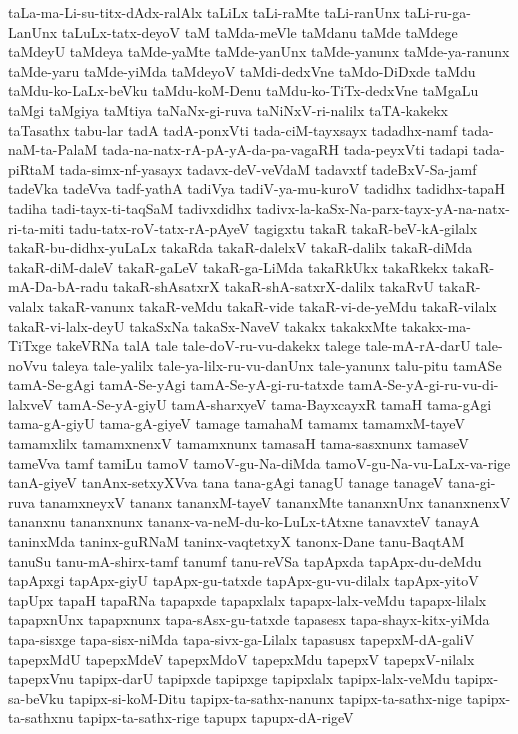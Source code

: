 {taLa-ma-Li-su-titx-dAdx-ralAlx
taLiLx
taLi-raMte
taLi-ranUnx
taLi-ru-ga-LanUnx
taLuLx-tatx-deyoV
taM
taMda-meVle
taMdanu
taMde
taMdege
taMdeyU
taMdeya
taMde-yaMte
taMde-yanUnx
taMde-yanunx
taMde-ya-ranunx
taMde-yaru
taMde-yiMda
taMdeyoV
taMdi-dedxVne
taMdo-DiDxde
taMdu
taMdu-ko-LaLx-beVku
taMdu-koM-Denu
taMdu-ko-TiTx-dedxVne
taMgaLu
taMgi
taMgiya
taMtiya
taNaNx-gi-ruva
taNiNxV-ri-nalilx
taTA-kakekx
taTasathx
tabu-lar
tadA
tadA-ponxVti
tada-ciM-tayxsayx
tadadhx-namf
tada-naM-ta-PalaM
tada-na-natx-rA-pA-yA-da-pa-vagaRH
tada-peyxVti
tadapi
tada-piRtaM
tada-simx-nf-yasayx
tadavx-deV-veVdaM
tadavxtf
tadeBxV-Sa-jamf
tadeVka
tadeVva
tadf-yathA
tadiVya
tadiV-ya-mu-kuroV
tadidhx
tadidhx-tapaH
tadiha
tadi-tayx-ti-taqSaM
tadivxdidhx
tadivx-la-kaSx-Na-parx-tayx-yA-na-natx-ri-ta-miti
tadu-tatx-roV-tatx-rA-pAyeV
tagigxtu
takaR
takaR-beV-kA-gilalx
takaR-bu-didhx-yuLaLx
takaRda
takaR-dalelxV
takaR-dalilx
takaR-diMda
takaR-diM-daleV
takaR-gaLeV
takaR-ga-LiMda
takaRkUkx
takaRkekx
takaR-mA-Da-bA-radu
takaR-shAsatxrX
takaR-shA-satxrX-dalilx
takaRvU
takaR-valalx
takaR-vanunx
takaR-veMdu
takaR-vide
takaR-vi-de-yeMdu
takaR-vilalx
takaR-vi-lalx-deyU
takaSxNa
takaSx-NaveV
takakx
takakxMte
takakx-ma-TiTxge
takeVRNa
talA
tale
tale-doV-ru-vu-dakekx
talege
tale-mA-rA-darU
tale-noVvu
taleya
tale-yalilx
tale-ya-lilx-ru-vu-danUnx
tale-yanunx
talu-pitu
tamASe
tamA-Se-gAgi
tamA-Se-yAgi
tamA-Se-yA-gi-ru-tatxde
tamA-Se-yA-gi-ru-vu-di-lalxveV
tamA-Se-yA-giyU
tamA-sharxyeV
tama-BayxcayxR
tamaH
tama-gAgi
tama-gA-giyU
tama-gA-giyeV
tamage
tamahaM
tamamx
tamamxM-tayeV
tamamxlilx
tamamxnenxV
tamamxnunx
tamasaH
tama-sasxnunx
tamaseV
tameVva
tamf
tamiLu
tamoV
tamoV-gu-Na-diMda
tamoV-gu-Na-vu-LaLx-va-rige
tanA-giyeV
tanAnx-setxyXVva
tana
tana-gAgi
tanagU
tanage
tanageV
tana-gi-ruva
tanamxneyxV
tananx
tananxM-tayeV
tananxMte
tananxnUnx
tananxnenxV
tananxnu
tananxnunx
tananx-va-neM-du-ko-LuLx-tAtxne
tanavxteV
tanayA
taninxMda
taninx-guRNaM
taninx-vaqtetxyX
tanonx-Dane
tanu-BaqtAM
tanuSu
tanu-mA-shirx-tamf
tanumf
tanu-reVSa
tapApxda
tapApx-du-deMdu
tapApxgi
tapApx-giyU
tapApx-gu-tatxde
tapApx-gu-vu-dilalx
tapApx-yitoV
tapUpx
tapaH
tapaRNa
tapapxde
tapapxlalx
tapapx-lalx-veMdu
tapapx-lilalx
tapapxnUnx
tapapxnunx
tapa-sAsx-gu-tatxde
tapasesx
tapa-shayx-kitx-yiMda
tapa-sisxge
tapa-sisx-niMda
tapa-sivx-ga-Lilalx
tapasusx
tapepxM-dA-galiV
tapepxMdU
tapepxMdeV
tapepxMdoV
tapepxMdu
tapepxV
tapepxV-nilalx
tapepxVnu
tapipx-darU
tapipxde
tapipxge
tapipxlalx
tapipx-lalx-veMdu
tapipx-sa-beVku
tapipx-si-koM-Ditu
tapipx-ta-sathx-nanunx
tapipx-ta-sathx-nige
tapipx-ta-sathxnu
tapipx-ta-sathx-rige
tapupx
tapupx-dA-rigeV
}
